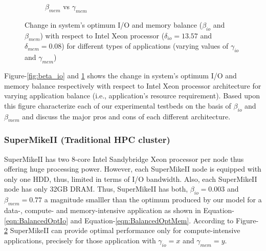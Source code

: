 \documentclass[journal]{IEEEtran}
\begin{document}
\begin{figure}[htb]
\begin{subfigure}[b]{0.48\textwidth}
                \caption{$\beta_{mem}$ vs  $\gamma_{mem}$}
                \label{fig:beta_mem}
   \end{subfigure}
   \caption{Change in system's optimum I/O and memory balance ($\beta_{io}$ and $\beta_{mem}$) with respect to Intel Xeon processor ($\delta_{io} = 13.57$ and $\delta_{mem} = 0.08$) for different types of applications (varying values of $\gamma_{io}$ and $\gamma_{mem}$)}
  \label{fig:BetaVsGamma}
\end{figure}
Figure-\ref{fig:beta_io} and \ref{fig:beta_mem} shows the change in system's optimum I/O and memory balance respectively with respect to Intel Xeon processor architecture for varying application balance (i.e., application's resource requirement). Based upon this figure characterize each of our experimental testbeds on the basis of $\beta_{io}$ and $\beta_{mem}$ and discuss the major pros and cons of each different architecture.  

\subsubsection{SuperMikeII (Traditional HPC cluster)}
SuperMikeII has two 8-core Intel Sandybridge Xeon processor per node thus oﬀering huge processing power. However, each SuperMikeII node is equipped with only one HDD, thus, limited in terms of I/O bandwidth. Also, each SuperMikeII node has only 32GB DRAM. Thus, SuperMikeII has both, $\beta_{io}=0.003$ and $\beta_{mem}=0.77$ a magnitude smalller than the optimum produced by our model for a data-, compute- and memory-intensive application as shown in Equation-\ref{eqn:BalancedOptIo} and Equation-\ref{eqn:BalancedOptMem}. According to Figure-\ref{fig:BetaVsGamma} SuperMikeII can provide optimal performance only for compute-intensive applications, precisely for those application with $\gamma_{io}=x$ and $\gamma_{mem}=y$.  
\end{document}
